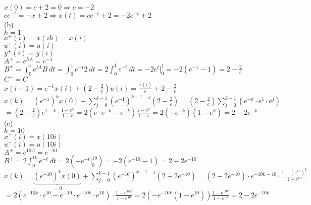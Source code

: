 $x(0)=c+2=0 \Rightarrow c=-2$\\
$ce^{-t}=-x+2 \Rightarrow \boxed{x(t)=ce^{-t}+2=-2e^{-t}+2}$\\


\noindent
(b)\\
$h=1$\\
$x^+(i)=x(ih)=x(i)$\\
$u^+(i)=u(i)$\\
$y^+(i)=y(i)$\\
$A^+=e^{hA}=e^{-1}$\\
$B^+=\int_0^1e^{tA}B\ dt =\int_0^1e^{-t}2\ dt=2\int_0^1e^{-t}\ dt = -2e^t|^1_0=-2(e^{-1}-1)=2-\frac{2}{e}$\\
$C^+=C$\\
$x(i+1)=e^{-1}x(i)+(2-\frac{2}{e})u(i)=\frac{x(i)}{e}+2-\frac{2}{e}$\\
$x(k)=(e^{-1})^kx(0)+\sum_{j=0}^{k-1}(e^{-1})^{k-1-j}(2-\frac{2}{e})=(2-\frac{2}{e})\sum_{j=0}^{k-1}(e^{-k}\cdot e^1\cdot e^j)$\\
$=(2-\frac{2}{e})e^{1-k}\cdot\frac{1-e^k}{1-e}=2(e\cdot e^{-k} -e^{-k})\frac{1-e^k}{1-e}=2(-e^{-k})(1-e^k)=2-2e^{-k}$\\

\noindent
(c)\\
$h=10$\\
$x^+(i)=x(10i)$\\
$u^+(i)=u(10i)$\\
$A^+=e^{10A}=e^{-10}$\\
$B^+=2\int_0^{10}e^{-t} \ dt=2(-e^{-t}|_0^{10})=-2(e^{-10}-1)=2-2e^{-10}$\\
$x(k)=\underbrace{(e^{-10})^kx(0)}_{=0}+\sum_{j=0}^{k-1}(e^{-10})^{k-1-j}(2-2e^{-10})=(2-2e^{-10})\cdot e^{-10k-10}\cdot\frac{1-(e^{10})^k}{1-e^{10}}$\\
$=2(e^{-10k}\cdot e^{10}-e^{-10}\cdot e^{-10k}\cdot e^{10})\cdot\frac{1-e^{10k}}{1-e^{10}}=2(-e^{-10k}(1-e^{10}))\frac{1-e^{10k}}{1-e^{10}}=2-2e^{-10k}$\\

